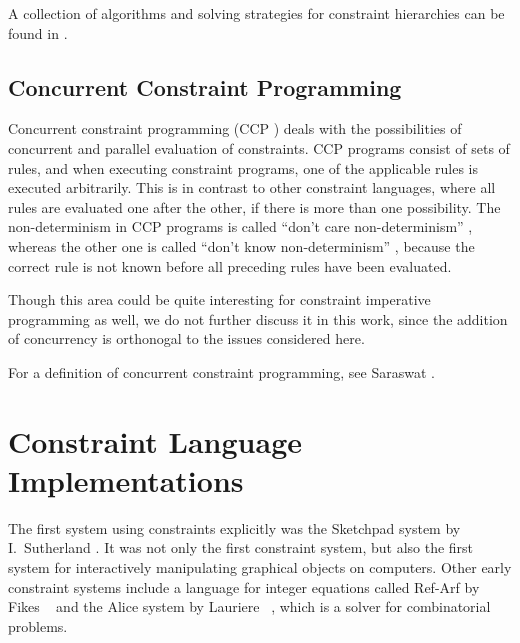 A collection of algorithms and solving strategies for constraint
hierarchies can be found in \cite{bartakHierarchies}.


\subsection{Concurrent Constraint Programming}
\label{sec:concurrent-constraint-programming}

Concurrent constraint programming%
 (CCP%
) deals with the possibilities
of concurrent and parallel evaluation of constraints.  CCP programs
consist of sets of rules, and when executing constraint programs, one
of the applicable rules is executed arbitrarily.  This is in contrast
to other constraint languages, where all rules are evaluated one after
the other, if there is more than one possibility.  The non-determinism
in CCP programs is called ``don't care non-determinism''%
%
, whereas the
other one is called ``don't know non-determinism''%
%
, because the correct rule is not
known before all preceding rules have been evaluated.

Though this area could be quite interesting for constraint imperative
programming as well, we do not further discuss it in this work, since
the addition of concurrency is orthonogal to the issues considered
here.

For a definition of concurrent constraint programming, see Saraswat%
 \cite{saraswat93cc}.





\section{Constraint Language Implementations}
\label{sec:constraint-language-implementations}

The first system using constraints explicitly was the Sketchpad%
 system by
I.~Sutherland%
 \cite{sutherland63sketchpad}.  It was not only the
first constraint system, but also the first system for interactively
manipulating graphical objects on computers.  Other early constraint
systems include a language for integer equations called Ref-Arf%
 by Fikes%
~\cite{fikes70refarf} and the Alice%
 system by
Lauriere%
~\cite{lauriere78alice}, which is a solver for
combinatorial problems.

